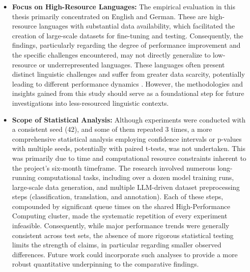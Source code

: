 \begin{itemize}
    \item \textbf{Focus on High-Resource Languages:} The empirical evaluation in this thesis primarily concentrated on English and German. 
    These are high-resource languages with substantial data availability, which facilitated the creation of large-scale datasets for fine-tuning and testing. 
    Consequently, the findings, particularly regarding the degree of performance improvement and the specific challenges encountered, may not directly generalize to low-resource or underrepresented languages. 
    These languages often present distinct linguistic challenges and suffer from greater data scarcity, potentially leading to different performance dynamics \cite{neupane2025generativeainamedentity}. 
    However, the methodologies and insights gained from this study should serve as a foundational step for future investigations into less-resourced linguistic contexts.

    \item \textbf{Scope of Statistical Analysis:} Although experiments were conducted with a consistent seed (42), and some of them repeated 3 times, a more comprehensive statistical analysis employing confidence intervals or p-values with multiple seeds, potentially with paired t-tests, was not undertaken. 
    This was primarily due to time and computational resource constraints inherent to the project's six-month timeframe. 
    The research involved numerous long-running computational tasks, including over a dozen model training runs, large-scale data generation, and multiple LLM-driven dataset preprocessing steps (classification, translation, and annotation). 
    Each of these steps, compounded by significant queue times on the shared High-Performance Computing cluster, made the systematic repetition of every experiment infeasible. 
    Consequently, while major performance trends were generally consistent across test sets, the absence of more rigorous statistical testing limits the strength of claims, in particular regarding smaller observed differences. Future work could incorporate such analyses to provide a more robust quantitative underpinning to the comparative findings.


\end{itemize}
